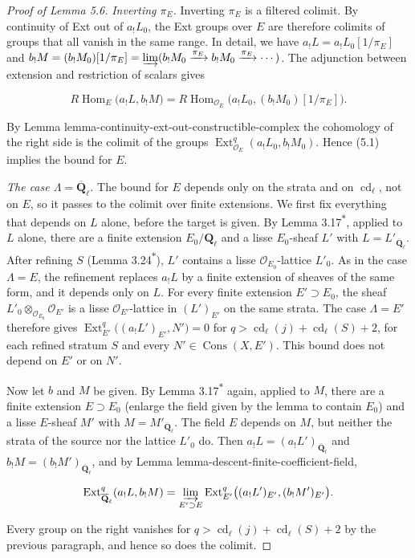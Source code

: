 \documentclass[11pt]{article}
\newcommand{\bpout}[1]{#1\textsuperscript{\hyperlink{bp-outside}{\ensuremath{\ast}}}}
\providecommand{\Cons}{}\renewcommand{\Cons}{\operatorname{Cons}}
\providecommand{\Ext}{}\renewcommand{\Ext}{\operatorname{Ext}}
\begin{document}
\begin{proof}[{Proof of Lemma 5.6}]
\emph{Inverting \(\pi_E\).} Inverting \(\pi_E\) is a filtered colimit. By continuity of Ext out of \(a_!L_0\), the Ext groups over \(E\) are therefore colimits of groups that all vanish in the same range. In detail, we have \(a_!L=a_!L_0[1/\pi_E]\) and \(b_!M=(b_!M_0)[1/\pi_E]=\varinjlim(b_!M_0\xrightarrow{\pi_E}b_!M_0\xrightarrow{\pi_E}\cdots)\). The adjunction between extension and restriction of scalars gives

\[
R\!\operatorname{Hom}_E\bigl(a_!L,b_!M\bigr)
=R\!\operatorname{Hom}_{\mathcal O_E}\bigl(a_!L_0,(b_!M_0)[1/\pi_E]\bigr).
\]

By Lemma lemma-continuity-ext-out-constructible-complex the cohomology of the right side is the colimit of the groups \(\Ext^q_{\mathcal O_E}(a_!L_0,b_!M_0)\). Hence (5.1) implies the bound for \(E\).

\emph{The case \(\Lambda=\overline{\mathbf Q}_\ell\).} The bound for \(E\) depends only on the strata and on \(\operatorname{cd}_\ell\), not on \(E\), so it passes to the colimit over finite extensions. We first fix everything that depends on \(L\) alone, before the target is given. By Lemma \bpout{3.17}, applied to \(L\) alone, there are a finite extension \(E_0/\mathbf Q_\ell\) and a lisse \(E_0\)-sheaf \(L'\) with \(L=L'_{\overline{\mathbf Q}_\ell}\). After refining \(S\) (Lemma \bpout{3.24}), \(L'\) contains a lisse \(\mathcal O_{E_0}\)-lattice \(L'_0\). As in the case \(\Lambda=E\), the refinement replaces \(a_!L\) by a finite extension of sheaves of the same form, and it depends only on \(L\). For every finite extension \(E'\supset E_0\), the sheaf \(L'_0\otimes_{\mathcal O_{E_0}}\mathcal O_{E'}\) is a lisse \(\mathcal O_{E'}\)-lattice in \((L')_{E'}\) on the same strata. The case \(\Lambda=E'\) therefore gives \(\Ext^q_{E'}\bigl((a_!L')_{E'},N'\bigr)=0\) for \(q>\operatorname{cd}_\ell(j)+\operatorname{cd}_\ell(S)+2\), for each refined stratum \(S\) and every \(N'\in\Cons(X,E')\). This bound does not depend on \(E'\) or on \(N'\).

Now let \(b\) and \(M\) be given. By Lemma \bpout{3.17} again, applied to \(M\), there are a finite extension \(E\supset E_0\) (enlarge the field given by the lemma to contain \(E_0\)) and a lisse \(E\)-sheaf \(M'\) with \(M=M'_{\overline{\mathbf Q}_\ell}\). The field \(E\) depends on \(M\), but neither the strata of the source nor the lattice \(L'_0\) do. Then \(a_!L=(a_!L')_{\overline{\mathbf Q}_\ell}\) and \(b_!M=(b_!M')_{\overline{\mathbf Q}_\ell}\), and by Lemma lemma-descent-finite-coefficient-field,

\[
\Ext^q_{\overline{\mathbf Q}_\ell}(a_!L,b_!M)
=\varinjlim_{E'\supset E}\Ext^q_{E'}\bigl((a_!L')_{E'},(b_!M')_{E'}\bigr).
\]

Every group on the right vanishes for \(q>\operatorname{cd}_\ell(j)+\operatorname{cd}_\ell(S)+2\) by the previous paragraph, and hence so does the colimit.
\end{proof}
\end{document}

